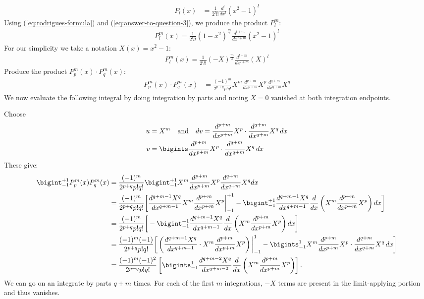 \begin{enumerate}
\begin{align}
            P_l(x)&=\frac{1}{2^ll!}\frac{d^l}{dx^l}\left(x^2-1\right)^l\label{eq:rodrigues-formula}
        \end{align}
        Using (\ref{eq:rodrigues-formula}) and (\ref{eq:answer-to-question-3}), we produce the product $P_l^m$:
        \begin{align}
            P_l^m(x)=\frac{1}{2^ll!}\left(1-x^2\right)^{\frac{m}{2}}\frac{d^{l+m}}{dx^{l+m}}\left(x^2-1\right)^l\label{eq:p_l^m-definition}
        \end{align}
        For our simplicity we take a notation $X(x)=x^2-1$:
        \begin{align}
            P_l^m(x)=\frac{1}{2^ll!}\left(-X\right)^{\frac{m}{2}}\frac{d^{l+m}}{dx^{l+m}}\left(X\right)^l\label{eq:p_l^m-definition}
        \end{align}
        Produce the product $\displaystyle P_p^m(x) \cdot P_q^m(x)$:
        \begin{align}
            P_p^m(x) \cdot P_q^m(x) &= \frac{(-1)^m}{2^{p+q}p!q!}X^m\frac{d^{p+m}}{dx^{p+m}}X^p\frac{d^{q+m}}{dx^{q+m}}X^q
        \end{align}
        We now evaluate the following integral by doing integration by parts and noting $X=0$ vanished at both integration endpoints.

        Choose
        \begin{align*}
            u &= X^m \quad \text{and} \quad dv = \frac{d^{p+m}}{dx^{p+m}} X^p \cdot \frac{d^{q+m}}{dx^{q+m}} X^q \, dx\notag\\
            v &= \bigints \frac{d^{p+m}}{dx^{p+m}} X^p \cdot \frac{d^{q+m}}{dx^{q+m}} X^q \, dx\notag
        \end{align*}
        These give:
        \begin{align}
             \bigint_{-1}^{+1}P_p^m(x)P_q^m(x)&=\frac{(-1)^m}{2^{p+q}p!q!}\bigint_{-1}^{+1}X^m\frac{d^{p+m}}{dx^{p+m}}X^p\frac{d^{q+m}}{dx^{q+m}}X^qdx\notag\\
             &=\frac{(-1)^m}{2^{p+q}p!q!}\bigg[\frac{d^{q+m-1}X^q}{dx^{q+m-1}}X^m\frac{d^{p+m}}{dx^{p+m}}X^p\bigg|_{-1}^{+1}-\bigint_{-1}^{+1}\frac{d^{q+m-1}X^q}{dx^{q+m-1}}\frac{d}{dx}\left(X^m\frac{d^{p+m}}{dx^{p+m}}X^p\right)dx\bigg]\notag\\
             &=\frac{(-1)^m}{2^{p+q}p!q!}\bigg[-\bigint_{-1}^{+1}\frac{d^{q+m-1}X^q}{dx^{q+m-1}}\frac{d}{dx}\left(X^m\frac{d^{p+m}}{dx^{p+m}}X^p\right)dx\bigg]\notag\\
             &=\frac{(-1)^m(-1)}{2^{p+q}p!q!}\bigg[\left( \frac{d^{q+m-1} X^q}{dx^{q+m-1}} \cdot X^m \frac{d^{p+m}}{dx^{p+m}} X^p \right) \bigg|_{-1}^{1} - \bigints_{-1}^{1} X^m \frac{d^{p+m}}{dx^{p+m}} X^p \cdot \frac{d^{q+m}}{dx^{q+m}} X^q \, dx\bigg]\notag\\
             &=\frac{(-1)^m(-1)^2}{2^{p+q} p! q!} \left[ \bigints_{-1}^{1}\frac{d^{q+m-2} X^q}{dx^{q+m-2}}\frac{d}{dx}\left(X^m \frac{d^{p+m}}{dx^{p+m}} X^p \right) \right].
        \end{align}
        We can go on an integrate by parts $q+m$ times. For each of the first $m$ integrations, $-X$ terms are present in the limit-applying portion and thus vanishes.


\end{enumerate}
